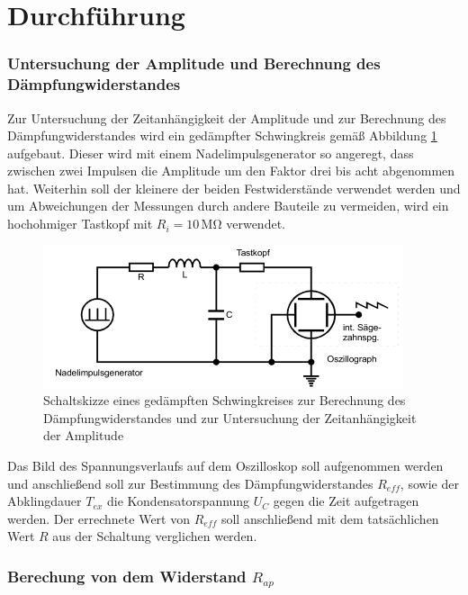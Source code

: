 \section{Durchführung}
\label{sec:Durchführung}

\subsubsection{Untersuchung der Amplitude und Berechnung des Dämpfungwiderstandes}

Zur Untersuchung der Zeitanhängigkeit der Amplitude und zur Berechnung des Dämpfungwiderstandes
wird ein gedämpfter Schwingkreis gemäß Abbildung \ref{fig:gsk2} aufgebaut. Dieser wird mit einem
Nadelimpulsgenerator so angeregt, dass zwischen zwei Impulsen die Amplitude um den Faktor drei 
bis acht abgenommen hat. Weiterhin soll der kleinere der beiden Festwiderstände verwendet werden
und um Abweichungen der Messungen durch andere Bauteile zu vermeiden, wird ein hochohmiger 
Tastkopf mit $R_i = 10\, \si{\mega\ohm}$ verwendet.

\begin{figure}[H]
  \centering
  \includegraphics{content/aufgabeA.png}
  \caption{Schaltskizze eines gedämpften Schwingkreises zur Berechnung des Dämpfungwiderstandes und zur Untersuchung der Zeitanhängigkeit der Amplitude}
  \label{fig:gsk2}
\end{figure}
\noindent
Das Bild des Spannungsverlaufs auf dem Oszilloskop soll aufgenommen werden und anschließend soll
zur Bestimmung des Dämpfungwiderstandes $R_{eff}$, sowie der Abklingdauer $T_{ex}$ die Kondensatorspannung
$U_C$ gegen die Zeit aufgetragen werden. Der errechnete Wert von $R_{eff}$ soll anschließend mit dem
tatsächlichen Wert $R$ aus der Schaltung verglichen werden.



\subsubsection{Berechung von dem Widerstand $R_{ap}$}
\label{sec:ap}

